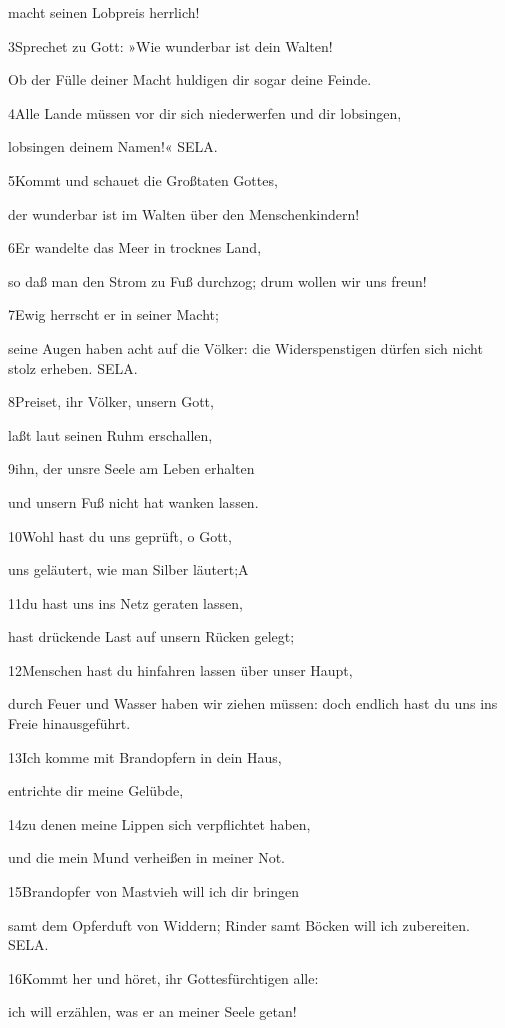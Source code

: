 macht seinen Lobpreis herrlich!

3Sprechet zu Gott: »Wie wunderbar ist dein Walten!

Ob der Fülle deiner Macht huldigen dir sogar deine Feinde.

4Alle Lande müssen vor dir sich niederwerfen und dir lobsingen,

lobsingen deinem Namen!« SELA.

5Kommt und schauet die Großtaten Gottes,

der wunderbar ist im Walten über den Menschenkindern!

6Er wandelte das Meer in trocknes Land,

so daß man den Strom zu Fuß durchzog; drum wollen wir uns freun!

7Ewig herrscht er in seiner Macht;

seine Augen haben acht auf die Völker: die Widerspenstigen dürfen sich
nicht stolz erheben. SELA.

8Preiset, ihr Völker, unsern Gott,

laßt laut seinen Ruhm erschallen,

9ihn, der unsre Seele am Leben erhalten

und unsern Fuß nicht hat wanken lassen.

10Wohl hast du uns geprüft, o Gott,

uns geläutert, wie man Silber läutert;{A}

11du hast uns ins Netz geraten lassen,

hast drückende Last auf unsern Rücken gelegt;

12Menschen hast du hinfahren lassen über unser Haupt,

durch Feuer und Wasser haben wir ziehen müssen: doch endlich hast du uns
ins Freie hinausgeführt.

13Ich komme mit Brandopfern in dein Haus,

entrichte dir meine Gelübde,

14zu denen meine Lippen sich verpflichtet haben,

und die mein Mund verheißen in meiner Not.

15Brandopfer von Mastvieh will ich dir bringen

samt dem Opferduft von Widdern; Rinder samt Böcken will ich zubereiten.
SELA.

16Kommt her und höret, ihr Gottesfürchtigen alle:

ich will erzählen, was er an meiner Seele getan!

